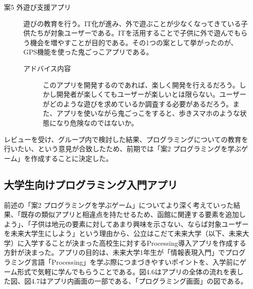 \documentclass[openany,11pt,papersize]{jsbook}
\begin{document}
\begin{description}
 \item[案5 外遊び支援アプリ]
遊びの教育を行う。IT化が進み、外で遊ぶことが少なくなってきている子供たちが対象ユーザーである。ITを活用することで子供に外で遊んでもらう機会を増やすことが目的である。その1つの案として挙がったのが、GPS機能を使った鬼ごっこアプリである。
	\begin{description}
 	\item[アドバイス内容]
	このアプリを開発するのであれば、楽しく開発を行えるだろう。しかし開発者が楽しくてもユーザーが楽しいとは限らない。ユーザーがどのような遊びを求めているか調査する必要があるだろう。また、アプリを使いながら鬼ごっこをすると、歩きスマホのような状態になり危険なのではないか。
	 \end{description}

 \end{description}
 
 \par レビューを受け、グループ内で検討した結果、プログラミングについての教育を行いたい、という意見が合致したため、前期では「案2 プログラミングを学ぶゲーム」を作成することに決定した。
 
 
 \subsection{大学生向けプログラミング入門アプリ}
\par 前述の「案2 プログラミングを学ぶゲーム」についてより深く考えていった結果、「既存の類似アプリと相違点を持たせるため、函館に関連する要素を追加しよう」、「子供は地元の要素に対してあまり興味を示さない、ならば対象ユーザーを未来大学生にしよう」という理由から、公立はこだて未来大学（以下、未来大学）に入学することが決まった高校生に対するProcessing導入アプリを作成する方針が決まった。アプリの目的は、未来大学1年生が「情報表現入門」でプログラミング言語「Processing」を学ぶ際につまづきやすいポイントを、入学前にゲーム形式で気軽に学んでもらうことである。図4.6はアプリの全体の流れを表した図、図4.7はアプリ内画面の一部である、「プログラミング画面」の図である。
\end{document}
